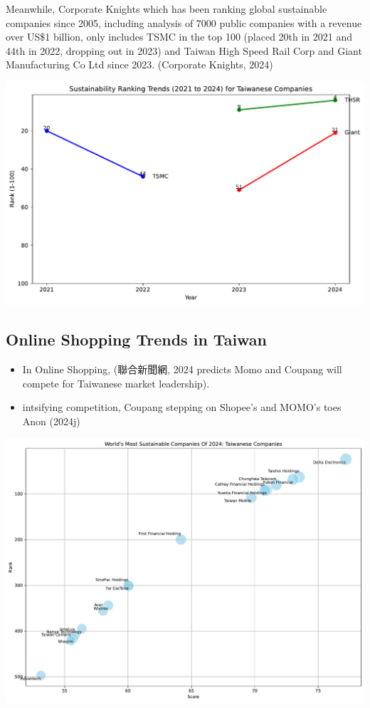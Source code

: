 \documentclass[
  letterpaper,
  DIV=11,
  numbers=noendperiod]{scrartcl}
\providecommand{\tightlist}{%
  \setlength{\itemsep}{0pt}\setlength{\parskip}{0pt}}\usepackage{longtable,booktabs,array}
\begin{document}
Meanwhile, Corporate Knights which has been ranking global sustainable
companies since 2005, including analysis of 7000 public companies with a
revenue over US\$1 billion, only includes TSMC in the top 100 (placed
20th in 2021 and 44th in 2022, dropping out in 2023) and Taiwan High
Speed Rail Corp and Giant Manufacturing Co Ltd since 2023. (Corporate
Knights, 2024)

\includegraphics{_thesis_files/figure-pdf/cell-11-output-1.pdf}

\subsection{Online Shopping Trends in
Taiwan}\label{online-shopping-trends-in-taiwan}

\begin{itemize}
\tightlist
\item
  In Online Shopping, (聯合新聞網, 2024 predicts Momo and Coupang will
  compete for Taiwanese market leadership).
\item
  intsifying competition, Coupang stepping on Shopee's and MOMO's toes
  Anon (2024j)
\end{itemize}

\includegraphics{_thesis_files/figure-pdf/cell-12-output-1.pdf}
\end{document}
